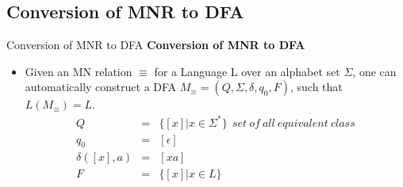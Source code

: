 \documentclass{beamer}
\begin{document}
\subsection{Conversion of MNR to DFA}	
\begin{frame}{Conversion of MNR to DFA}
	\textbf{Conversion of MNR to DFA}
	\begin{itemize}
		\item Given an MN relation $\equiv$ for a Language L over an alphabet set $\Sigma$, one can automatically construct a DFA $M_\equiv = (Q,\Sigma, \delta ,q_0,F)$, such that $L(M_\equiv)=L.$ 
		\begin{eqnarray*}
				Q &=&  \{[x] \big| x\in \Sigma^*\}\ \ set \ of \ all\ equivalent\  class \\
				q_0 &=& [\epsilon] \\
			\delta([x],a)&=&[xa] \\
			F&=& \{[x] \big| x\in L \}
		\end{eqnarray*}
		
	\end{itemize}
\end{frame}	
\end{document}
